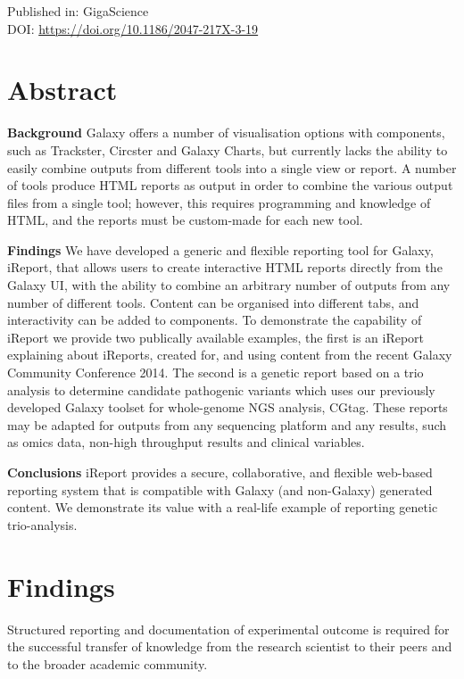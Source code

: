 Published in: GigaScience \\
DOI: \url{https://doi.org/10.1186/2047-217X-3-19} \\

\section*{Abstract}

\textbf{Background} Galaxy offers a number of visualisation options with components, such as Trackster, Circster and Galaxy Charts, but currently lacks the ability to easily combine outputs from different tools into a single view or report. A number of tools produce HTML reports as output in order to combine the various output files from a single tool; however, this requires programming and knowledge of HTML, and the reports must be custom-made for each new tool.

\textbf{Findings}
We have developed a generic and flexible reporting tool for Galaxy, iReport, that allows users to create interactive HTML reports directly from the Galaxy UI, with the ability to combine an arbitrary number of outputs from any number of different tools. Content can be organised into different tabs, and interactivity can be added to components. To demonstrate the capability of iReport we provide two publically available examples, the first is an iReport explaining about iReports, created for, and using content from the recent Galaxy Community Conference 2014. The second is a genetic report based on a trio analysis to determine candidate pathogenic variants which uses our previously developed Galaxy toolset for whole-genome NGS analysis, CGtag. These reports may be adapted for outputs from any sequencing platform and any results, such as omics data, non-high throughput results and clinical variables.

\textbf{Conclusions}
iReport provides a secure, collaborative, and flexible web-based reporting system that is compatible with Galaxy (and non-Galaxy) generated content. We demonstrate its value with a real-life example of reporting genetic trio-analysis.


\section*{Findings}

Structured reporting and documentation of experimental outcome is required for the successful transfer of knowledge from the research scientist to their peers and to the broader academic community.

